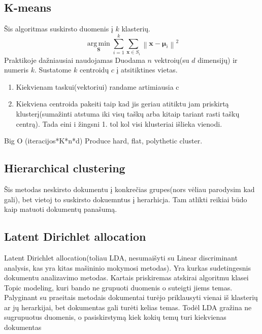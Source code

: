 \documentclass{VUMIFInfKursinis}
\begin{document}
	\subsection{K-means}
Šis algoritmas suskirsto duomenis į $ k $ klasterių.
	\[ \underset{\mathbf{S}} {\operatorname{arg\,min}}  \sum_{i=1}^{k} \sum_{\mathbf x \in S_i} \left\| \mathbf x - \boldsymbol\mu_i \right\|^2 \]
	Praktikoje dažniausiai naudojamas
	Duodama $n$ vektroių(su $d$ dimensijų) ir numeris $k$.
Sustatome $k$ centroidų $c$ į atsitiktines vietas.
\begin{enumerate}
\item Kiekvienam taskui(vektoriui) randame artimiausia c
\item Kiekviena centroida pakeiti taip kad jis geriau atitiktu jam priskirtą klusterį(sumažinti atstuma iki visų taškų arba kitaip tariant rasti taškų centrą). Tada eini i žingsni  1. tol kol visi klusteriai išlieka vienodi.
\end{enumerate}
Big O (iteracijos*K*n*d)
Produce hard, flat, polythetic cluster. 

\subsection{Hierarchical clustering}
Šis metodas neskirsto dokumentu į konkrečias grupes(nors vėliau parodysim kad gali), bet vietoj to suskirsto dokuemntus į herarhicja. Tam atlikti reikiai būdo kaip matuoti dokumentų panašumą. 
\subsection{Latent Dirichlet allocation}
	Latent Dirichlet allocation(toliau LDA, nesumaišyti su Linear discriminant analysis, kas yra kitas mašininio mokymosi metodas). Yra kurkas sudetingesnis dokumentu analizavimo metodas. Kartais priskiremas atskirai algoritmu klasei Topic modeling, kuri bando ne grupuoti duomenis o suteigti jiems temas. Palyginant su praeitais metodais dokumentai turėjo priklausyti vienai iš klasterių ar jų herarkijai, bet dokumentas gali turėti kelias temas. 
Todėl LDA gražina ne sugrupuotus duomenis, o pasiskirstymą kiek kokių temų turi kiekvienas dokumentas  
\end{document}
